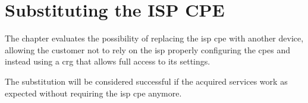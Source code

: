 \section{Substituting the ISP CPE}
\label{section:subs_isp_cpe}

The chapter evaluates the possibility of replacing the \gls{isp} \gls{cpe} with another device, allowing the customer not to rely on the \gls{isp} properly configuring the \glspl{cpe} and instead using a \gls{crg} that allows full access to its settings.

The substitution will be considered successful if the acquired services work as expected without requiring the \gls{isp} \gls{cpe} anymore.





